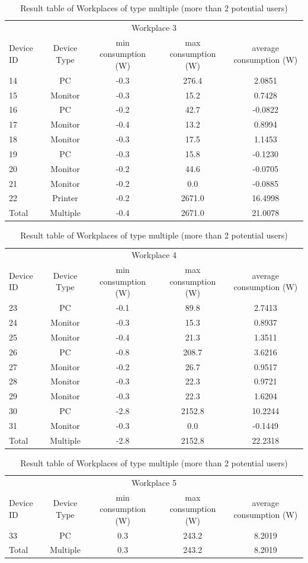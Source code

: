 \begin{table}[h]
	\centering
		\begin{tabular}{l|c|c|c|c}
		\multicolumn{5}{c}{Workplace 3} \\
		Device ID & Device Type & min consumption (W)& max consumption (W)& average consumption (W)\\
		14 & PC & -0.3 & 276.4 & 2.0851 \\
		15 & Monitor & -0.3 & 15.2 & 0.7428 \\
		16 & PC & -0.2 & 42.7 & -0.0822 \\
		17 & Monitor & -0.4 & 13.2 & 0.8994 \\
		18 & Monitor & -0.3 & 17.5 & 1.1453 \\
		19 & PC & -0.3 & 15.8 & -0.1230 \\
		20 & Monitor & -0.2 & 44.6 & -0.0705 \\
		21 & Monitor & -0.2 & 0.0 & -0.0885 \\
		22 & Printer & -0.2 & 2671.0 & 16.4998 \\
		\hline
		Total & Multiple & -0.4 & 2671.0 & 21.0078
	\end{tabular}
	\begin{tabular}{l|c|c|c|c}
		\multicolumn{5}{c}{Workplace 4} \\
		Device ID & Device Type & min consumption (W)& max consumption (W)& average consumption (W)\\
		23 & PC &-0.1 & 89.8 & 2.7413 \\
		24 & Monitor & -0.3 & 15.3 & 0.8937 \\
		25 & Monitor & -0.4 & 21.3 & 1.3511 \\
		26 & PC & -0.8 & 208.7 & 3.6216 \\
		27 & Monitor & -0.2 & 26.7 & 0.9517 \\
		28 & Monitor & -0.3 & 22.3 & 0.9721 \\
		29 & Monitor & -0.3 & 22.3 & 1.6204 \\
		30 & PC & -2.8 & 2152.8 & 10.2244 \\
		31 & Monitor & -0.3 & 0.0 & -0.1449 \\
		\hline
		Total & Multiple & -2.8 & 2152.8 & 22.2318
	\end{tabular} 
	\begin{tabular}{l|c|c|c|c}
		\multicolumn{5}{c}{Workplace 5} \\
		Device ID & Device Type & min consumption (W)& max consumption (W)& average consumption (W)\\
		33 & PC & 0.3 & 243.2 & 8.2019 \\
		\hline
		Total& Multiple & 0.3 & 243.2 & 8.2019 \\
	\end{tabular}
	\caption{Result table of Workplaces of type multiple (more than 2 potential users)}
	\label{tab:multi_wp}
\end{table}
